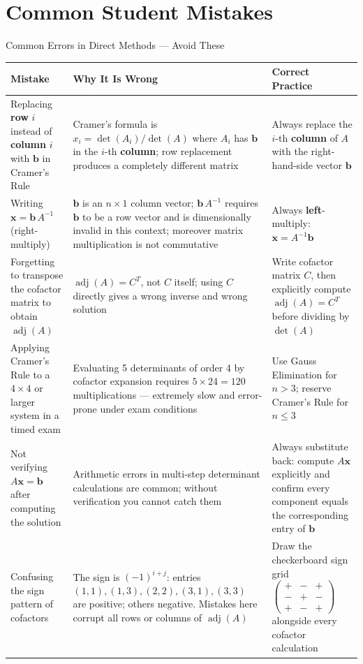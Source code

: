 \documentclass[12pt,a4paper]{article}
\begin{document}
\section{Common Student Mistakes}

\begin{mistakebox}{Common Errors in Direct Methods --- Avoid These}
\begin{tabular}{@{}p{5cm} p{5cm} p{4.5cm}@{}}
\toprule
\textbf{Mistake} & \textbf{Why It Is Wrong} & \textbf{Correct Practice} \\
\midrule
Replacing \textbf{row} $i$ instead of \textbf{column} $i$ with $\mathbf{b}$ in Cramer's Rule &
Cramer's formula is $x_i = \det(A_i)/\det(A)$ where $A_i$ has $\mathbf{b}$ in the $i$-th \textbf{column}; row replacement produces a completely different matrix &
Always replace the $i$-th \textbf{column} of $A$ with the right-hand-side vector $\mathbf{b}$ \\
\addlinespace
Writing $\mathbf{x} = \mathbf{b}\,A^{-1}$ (right-multiply) &
$\mathbf{b}$ is an $n\times1$ column vector; $\mathbf{b}\,A^{-1}$ requires $\mathbf{b}$ to be a row vector and is dimensionally invalid in this context; moreover matrix multiplication is not commutative &
Always \textbf{left}-multiply: $\mathbf{x} = A^{-1}\mathbf{b}$ \\
\addlinespace
Forgetting to transpose the cofactor matrix to obtain $\operatorname{adj}(A)$ &
$\operatorname{adj}(A) = C^T$, not $C$ itself; using $C$ directly gives a wrong inverse and wrong solution &
Write cofactor matrix $C$, then explicitly compute $\operatorname{adj}(A) = C^T$ before dividing by $\det(A)$ \\
\addlinespace
Applying Cramer's Rule to a $4\times4$ or larger system in a timed exam &
Evaluating 5 determinants of order 4 by cofactor expansion requires $5\times24 = 120$ multiplications --- extremely slow and error-prone under exam conditions &
Use Gauss Elimination for $n>3$; reserve Cramer's Rule for $n\leq3$ \\
\addlinespace
Not verifying $A\mathbf{x}=\mathbf{b}$ after computing the solution &
Arithmetic errors in multi-step determinant calculations are common; without verification you cannot catch them &
Always substitute back: compute $A\mathbf{x}$ explicitly and confirm every component equals the corresponding entry of $\mathbf{b}$ \\
\addlinespace
Confusing the sign pattern of cofactors &
The sign is $(-1)^{i+j}$: entries $(1,1),(1,3),(2,2),(3,1),(3,3)$ are positive; others negative. Mistakes here corrupt all rows or columns of $\operatorname{adj}(A)$ &
Draw the checkerboard sign grid $\begin{pmatrix}+&-&+\\-&+&-\\+&-&+\end{pmatrix}$ alongside every cofactor calculation \\
\bottomrule
\end{tabular}
\end{mistakebox}
\end{document}
